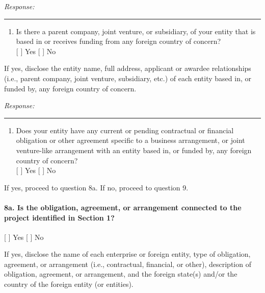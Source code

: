 \documentclass[
]{article}
\providecommand{\tightlist}{%
  \setlength{\itemsep}{0pt}\setlength{\parskip}{0pt}}
\begin{document}
\emph{Response:}

\begin{center}\rule{0.5\linewidth}{0.5pt}\end{center}

\begin{enumerate}
\def\labelenumi{\arabic{enumi}.}
\setcounter{enumi}{6}
\tightlist
\item
  Is there a parent company, joint venture, or subsidiary, of your
  entity that is based in or receives funding from any foreign country
  of concern?\\
  {[} {]} Yes {[} {]} No
\end{enumerate}

If yes, disclose the entity name, full address, applicant or awardee
relationships (i.e., parent company, joint venture, subsidiary, etc.) of
each entity based in, or funded by, any foreign country of concern.

\emph{Response:}

\begin{center}\rule{0.5\linewidth}{0.5pt}\end{center}

\begin{enumerate}
\def\labelenumi{\arabic{enumi}.}
\setcounter{enumi}{7}
\tightlist
\item
  Does your entity have any current or pending contractual or financial
  obligation or other agreement specific to a business arrangement, or
  joint venture-like arrangement with an entity based in, or funded by,
  any foreign country of concern?\\
  {[} {]} Yes {[} {]} No
\end{enumerate}

If yes, proceed to question 8a. If no, proceed to question 9.

\paragraph{8a. Is the obligation, agreement, or arrangement connected to
the project identified in Section
1?}\label{8a-is-the-obligation-agreement-or-arrangement-connected-to-the-project-identified-in-section-1}

{[} {]} Yes {[} {]} No

If yes, disclose the name of each enterprise or foreign entity, type of
obligation, agreement, or arrangement (i.e., contractual, financial, or
other), description of obligation, agreement, or arrangement, and the
foreign state(s) and/or the country of the foreign entity (or entities).
\end{document}
